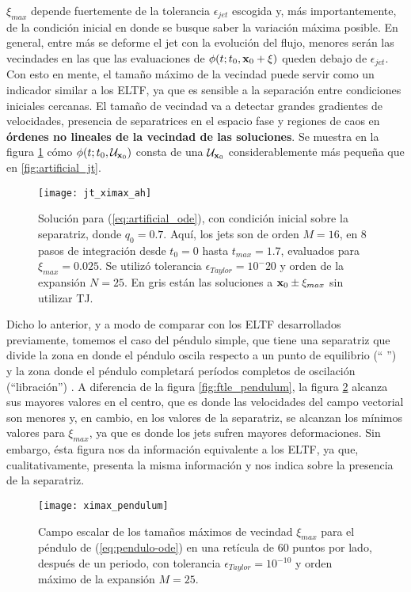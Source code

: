 $\xi_{max}$ depende fuertemente de la tolerancia $\epsilon_{jet}$ escogida y, más importantemente, de la condición inicial en donde se busque saber la variación máxima posible. En general, entre más se deforme el jet con la evolución del flujo, menores serán las vecindades en las que las evaluaciones de $\phi(t;t_0,\mathbf{x}_0 + \xi)$ queden debajo de $\epsilon_{jet}$. Con esto en mente, el tamaño máximo de la vecindad puede servir como un indicador similar a los ELTF, ya que es sensible a la separación entre condiciones iniciales cercanas. El tamaño de vecindad va a detectar grandes gradientes de velocidades, presencia de separatrices en el espacio fase y regiones de caos en \textbf{órdenes no lineales de la vecindad de las soluciones}. Se muestra en la figura \ref{fig:jt_ximax_ah} cómo $\phi(t;t_0,\mathcal{U}_{\mathbf{x}_0} )$ consta de una $\mathcal{U}_{\mathbf{x}_0}$ considerablemente más pequeña que en \ref{fig:artificial_jt}.

\begin{figure}[h!]
 \centering
 \texttt{[image: jt\_ximax\_ah]}
 \caption{Solución para (\ref{eq:artificial_ode}), con condición inicial sobre la separatriz, donde $q_0 = 0.7$. Aquí, los jets son de orden $M=16$, en $8$ pasos de integración desde $t_0 = 0$ hasta $t_{max} = 1.7$, evaluados para $\xi_{max} = 0.025$. Se utilizó tolerancia $\epsilon_{Taylor} = 10^-{20}$ y orden de la expansión $N=25$. En gris están las soluciones a $\mathbf{x}_0 \pm \xi_{max}$ sin utilizar TJ.}
 \label{fig:jt_ximax_ah}
\end{figure}

Dicho lo anterior, y a modo de comparar con los ELTF desarrollados previamente, tomemos el caso del péndulo simple, que tiene una separatriz que divide la zona en donde el péndulo oscila respecto a un punto de equilibrio (`` '') y la zona donde el péndulo completará períodos completos de oscilación (``libración'') . A diferencia de la figura \ref{fig:ftle_pendulum}, la figura \ref{fig:ximax_pendulum} alcanza sus mayores valores en el centro, que es donde las velocidades del campo vectorial son menores y, en cambio, en los valores de la separatriz, se alcanzan los mínimos valores para $\xi_{max}$, ya que es donde los jets sufren mayores deformaciones. Sin embargo, ésta figura nos da información equivalente a los ELTF, ya que, cualitativamente, presenta la misma información y nos indica sobre la presencia de la separatriz. 

\begin{figure}[h!]
 \centering
 \texttt{[image: ximax\_pendulum]}
 \caption{Campo escalar de los tamaños máximos de vecindad $\xi_{max}$ para el péndulo de (\ref{eq:pendulo-ode}) en una retícula de $60$ puntos por lado, después de un periodo, con tolerancia $\epsilon_{Taylor} = 10^{-10}$ y orden máximo de la expansión $M = 25$.}
 \label{fig:ximax_pendulum}
\end{figure}

